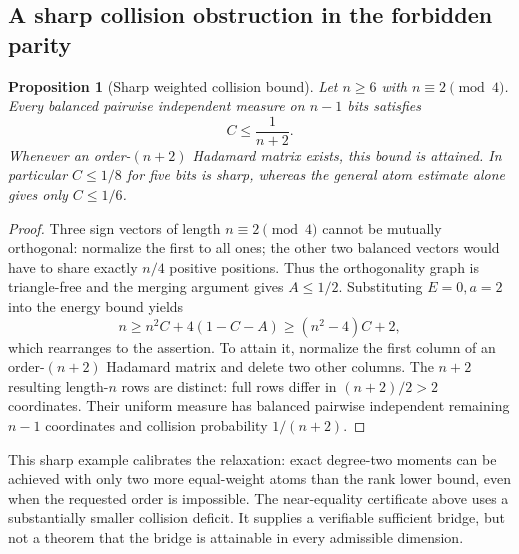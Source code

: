 \documentclass[11pt]{article}
\newtheorem{proposition}[theorem]{Proposition}
\begin{document}
\subsection{A sharp collision obstruction in the forbidden parity}
\begin{proposition}[Sharp weighted collision bound]
\label{prop:discrete-parity-collision}
Let $n\ge6$ with $n\equiv2\pmod4$. Every balanced pairwise independent
measure on $n-1$ bits satisfies
\[
 C\le\frac1{n+2}.
\]
Whenever an order-$(n+2)$ Hadamard matrix exists, this bound is attained.
In particular $C\le1/8$ for five bits is sharp, whereas the general
atom estimate alone gives only $C\le1/6$.
\end{proposition}
\begin{proof}
Three sign vectors of length $n\equiv2\pmod4$ cannot be mutually
orthogonal: normalize the first to all ones; the other two balanced
vectors would have to share exactly $n/4$ positive positions.
Thus the orthogonality graph is triangle-free and the merging argument
gives $A\le1/2$. Substituting $E=0,a=2$ into the energy bound yields
\[
 n\ge n^2C+4(1-C-A)\ge(n^2-4)C+2,
\]
which rearranges to the assertion. To attain it, normalize the first
column of an order-$(n+2)$ Hadamard matrix and delete two other columns.
The $n+2$ resulting length-$n$ rows are distinct: full rows differ in
$(n+2)/2>2$ coordinates. Their uniform measure has balanced pairwise
independent remaining $n-1$ coordinates and collision probability
$1/(n+2)$.
\end{proof}
This sharp example calibrates the relaxation: exact degree-two moments
can be achieved with only two more equal-weight atoms than the
rank lower bound, even when the requested order is impossible. The
near-equality certificate above uses a substantially smaller collision
deficit. It supplies a verifiable sufficient bridge, but not a theorem
that the bridge is attainable in every admissible dimension.
\end{document}
